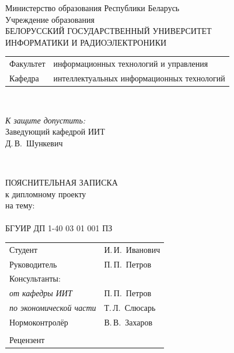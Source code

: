 \begin{titlepage}
  \begin{center}
    Министерство образования Республики Беларусь\\[1em]
    Учреждение образования\\
    БЕЛОРУССКИЙ ГОСУДАРСТВЕННЫЙ УНИВЕРСИТЕТ \\
    ИНФОРМАТИКИ И РАДИОЭЛЕКТРОНИКИ\\[1em]

    \begin{minipage}{\textwidth}
      \begin{flushleft}
        \begin{tabular}{ l l }
          Факультет & информационных технологий и управления\\
          Кафедра   & интеллектуальных информационных технологий
        \end{tabular}
      \end{flushleft}
    \end{minipage}\\[1em]

    \begin{flushright}
      \begin{minipage}{0.4\textwidth}
        \textit{К защите допустить:}\\[0.8em]
        Заведующий кафедрой ИИТ\\[0.45em]
        \underline{\hspace*{2.8cm}} Д.\,В.~Шункевич
      \end{minipage}\\[2.2em]
    \end{flushright}

    {ПОЯСНИТЕЛЬНАЯ ЗАПИСКА}\\
    {к дипломному проекту}\\
    {на тему:}\\[1em]
    \textbf{\large \MakeUppercase{\topicName}}\\[1em]


    {БГУИР ДП 1-40 03 01 001 ПЗ}\\[2em]

    \begin{tabular}{ p{}p{} }
      Студент & И.\,И.~Иванович \\
      Руководитель & П.\,П.~Петров \\
      Консультанты: &\\
      \hspace*{3ex}\emph{от кафедры ИИТ} & П.\,П.~Петров \\
      \hspace*{3ex}\emph{по экономической части} & Т.\,Л.~Слюсарь \\
      Нормоконтролёр & В.\,В.~Захаров\\
      & \\
      Рецензент &
    \end{tabular}


\end{center}
\end{titlepage}
